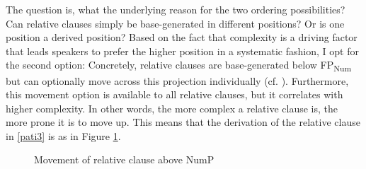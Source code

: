 The question is, what the underlying reason for the two ordering possibilities? Can relative clauses simply be base-generated in different positions? Or is one position a derived position? Based on the fact that complexity is a driving factor that leads speakers to prefer the higher position in a systematic fashion, I opt for the second option: Concretely, relative clauses are base-generated below FP\textsubscript{Num} but can optionally move across this projection individually (cf. \citealt{laenzlinger:2011:elements, kim:2019:syntax}). Furthermore, this movement option is available to all relative clauses, but it correlates with higher complexity. In other words, the more complex a relative clause is, the more prone it is to move up. This means that the derivation of the relative clause in \ref{pati3} is as in Figure \ref{movement Rc above num}.

\begin{figure}
\centering
\caption{Movement of relative clause above NumP}
\label{movement Rc above num}
\end{figure}

